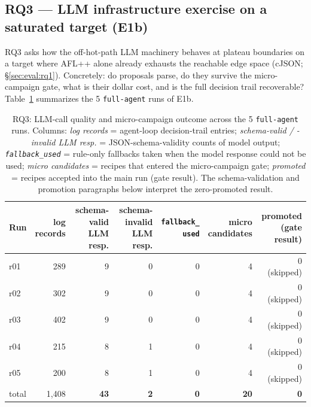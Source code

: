 \documentclass[11pt]{article}
\begin{document}
\subsection{RQ3 --- LLM infrastructure exercise on a saturated target (E1b)}
\label{sec:eval:rq3}

RQ3 asks how the off-hot-path LLM machinery behaves at plateau
boundaries on a target where AFL++ alone already exhausts the
reachable edge space (cJSON; \S\ref{sec:eval:rq1}). Concretely: do
proposals parse, do they survive the micro-campaign gate, what is
their dollar cost, and is the full decision trail recoverable?
Table~\ref{tab:rq3-llm} summarizes the 5 \texttt{full-agent} runs of
E1b.

\begin{table}[t]
  \centering
  \footnotesize
  \setlength{\tabcolsep}{6pt}
  \begin{tabular}{@{}lrrrrrr@{}}
    \toprule
    Run & \makecell[b]{log\\records} & \makecell[b]{schema-valid\\LLM resp.} & \makecell[b]{schema-invalid\\LLM resp.} & \makecell[b]{\texttt{fallback\_}\\\texttt{used}} & \makecell[b]{micro\\candidates} & \makecell[b]{promoted\\(gate result)} \\
    \midrule
    r01 & 289 & 9 & 0 & 0 & 4 & 0 (skipped) \\
    r02 & 302 & 9 & 0 & 0 & 4 & 0 (skipped) \\
    r03 & 402 & 9 & 0 & 0 & 4 & 0 (skipped) \\
    r04 & 215 & 8 & 1 & 0 & 4 & 0 (skipped) \\
    r05 & 200 & 8 & 1 & 0 & 4 & 0 (skipped) \\
    \midrule
    total & 1{,}408 & \textbf{43} & \textbf{2} & \textbf{0} & \textbf{20} & \textbf{0} \\
    \bottomrule
  \end{tabular}
  \caption{RQ3: LLM-call quality and micro-campaign outcome across
  the 5 \texttt{full-agent} runs. Columns: \emph{log records} =
  agent-loop decision-trail entries; \emph{schema-valid / -invalid
  LLM resp.} = JSON-schema-validity counts of model output;
  \emph{\texttt{fallback\_used}} = rule-only fallbacks taken when the
  model response could not be used; \emph{micro candidates} = recipes
  that entered the micro-campaign gate; \emph{promoted} = recipes
  accepted into the main run (gate result). The schema-validation and
  promotion paragraphs below interpret the zero-promoted result.}
  \label{tab:rq3-llm}
\end{table}
\end{document}
